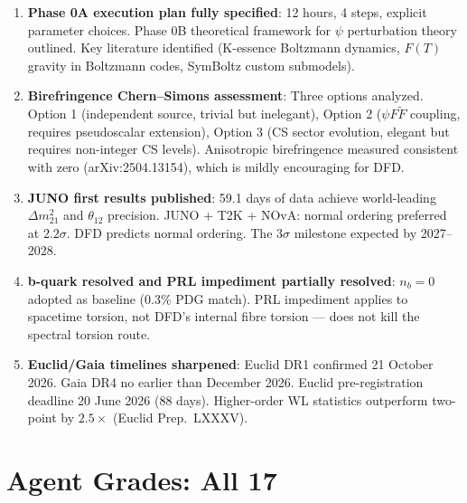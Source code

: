 \documentclass[11pt,a4paper]{article}
\begin{document}
\begin{enumerate}
\item \textbf{Phase 0A execution plan fully specified}: 12 hours, 4 steps, explicit parameter choices. Phase 0B theoretical framework for $\psi$ perturbation theory outlined. Key literature identified (K-essence Boltzmann dynamics, $F(T)$ gravity in Boltzmann codes, SymBoltz custom submodels).

\item \textbf{Birefringence Chern--Simons assessment}: Three options analyzed. Option 1 (independent source, trivial but inelegant), Option 2 ($\psi F \tilde{F}$ coupling, requires pseudoscalar extension), Option 3 (CS sector evolution, elegant but requires non-integer CS levels). Anisotropic birefringence measured consistent with zero (arXiv:2504.13154), which is mildly encouraging for DFD.

\item \textbf{JUNO first results published}: 59.1 days of data achieve world-leading $\Delta m^2_{21}$ and $\theta_{12}$ precision. JUNO + T2K + NOvA: normal ordering preferred at $2.2\sigma$. DFD predicts normal ordering. The $3\sigma$ milestone expected by 2027--2028.

\item \textbf{b-quark resolved and PRL impediment partially resolved}: $n_b = 0$ adopted as baseline (0.3\% PDG match). PRL impediment applies to spacetime torsion, not DFD's internal fibre torsion --- does not kill the spectral torsion route.

\item \textbf{Euclid/Gaia timelines sharpened}: Euclid DR1 confirmed 21 October 2026. Gaia DR4 no earlier than December 2026. Euclid pre-registration deadline 20 June 2026 (88 days). Higher-order WL statistics outperform two-point by $2.5\times$ (Euclid Prep.\ LXXXV).
\end{enumerate}


\part{Agent Grades: All 17}
\end{document}
